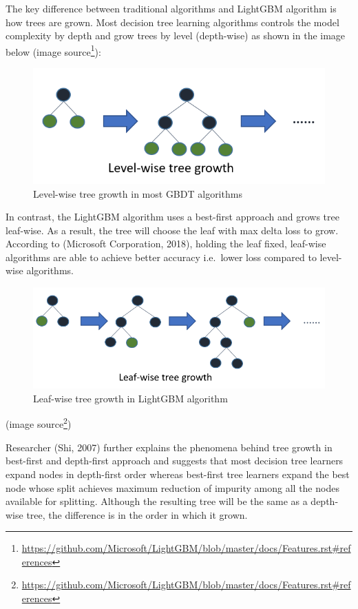 \documentclass[11pt,oneside,a4paper]{reedthesis}
\begin{document}
The key difference between traditional algorithms and LightGBM algorithm
is how trees are grown. Most decision tree learning algorithms controls
the model complexity by depth and grow trees by level (depth-wise) as
shown in the image below (image source\footnote{\url{https://github.com/Microsoft/LightGBM/blob/master/docs/Features.rst\#references}}):
\begin{figure}

{\centering \includegraphics[width=0.65\linewidth]{figure/depthwise} 

}

\caption{Level-wise tree growth in most GBDT algorithms}\label{fig:depthwise}
\end{figure}
In contrast, the LightGBM algorithm uses a best-first approach and grows
tree leaf-wise. As a result, the tree will choose the leaf with max
delta loss to grow. According to (Microsoft Corporation, 2018), holding
the leaf fixed, leaf-wise algorithms are able to achieve better accuracy
i.e.~lower loss compared to level-wise algorithms.
\begin{figure}
\includegraphics[width=1\linewidth]{figure/leafwise} \caption{Leaf-wise tree growth in LightGBM algorithm}\label{fig:leafwise}
\end{figure}
(image source\footnote{\url{https://github.com/Microsoft/LightGBM/blob/master/docs/Features.rst\#references}})

Researcher (Shi, 2007) further explains the phenomena behind tree growth
in best-first and depth-first approach and suggests that most decision
tree learners expand nodes in depth-first order whereas best-first tree
learners expand the best node whose split achieves maximum reduction of
impurity among all the nodes available for splitting. Although the
resulting tree will be the same as a depth-wise tree, the difference is
in the order in which it grown.
\end{document}
